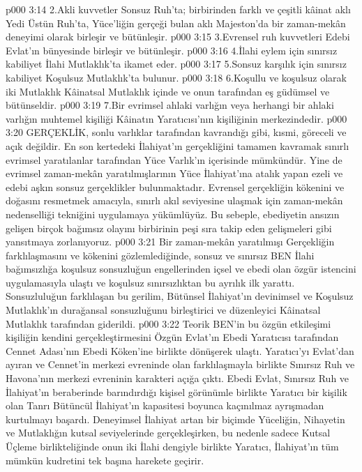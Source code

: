 \vs p000 3:14 2.\bibnobreakspace Akli kuvvetler Sonsuz Ruh’ta; birbirinden farklı ve çeşitli kâinat aklı Yedi Üstün Ruh’ta, Yüce’liğin gerçeği bulan aklı Majeston’da bir zaman\hyp{}mekân deneyimi olarak birleşir ve bütünleşir.
\vs p000 3:15 3.\bibnobreakspace Evrensel ruh kuvvetleri Edebi Evlat’ın bünyesinde birleşir ve bütünleşir.
\vs p000 3:16 4.\bibnobreakspace İlahi eylem için sınırsız kabiliyet İlahi Mutlaklık’ta ikamet eder.
\vs p000 3:17 5.\bibnobreakspace Sonsuz karşılık için sınırsız kabiliyet Koşulsuz Mutlaklık’ta bulunur.
\vs p000 3:18 6.\bibnobreakspace Koşullu ve koşulsuz olarak iki Mutlaklık Kâinatsal Mutlaklık içinde ve onun tarafından eş güdümsel ve bütünseldir.
\vs p000 3:19 7.\bibnobreakspace Bir evrimsel ahlaki varlığın veya herhangi bir ahlaki varlığın muhtemel kişiliği Kâinatın Yaratıcısı’nın kişiliğinin merkezindedir.
\vs p000 3:20 GERÇEKLİK, sonlu varlıklar tarafından kavrandığı gibi, kısmi, göreceli ve açık değildir. En son kertedeki İlahiyat’ın gerçekliğini tamamen kavramak sınırlı evrimsel yaratılanlar tarafından Yüce Varlık’ın içerisinde mümkündür. Yine de evrimsel zaman\hyp{}mekân yaratılmışlarının Yüce İlahiyat’ına atalık yapan ezeli ve edebi aşkın sonsuz gerçeklikler bulunmaktadır. Evrensel gerçekliğin kökenini ve doğasını resmetmek amacıyla, sınırlı akıl seviyesine ulaşmak için zaman\hyp{}mekân nedenselliği tekniğini uygulamaya yükümlüyüz. Bu sebeple, ebediyetin ansızın gelişen birçok bağımsız olayını birbirinin peşi sıra takip eden gelişmeleri gibi yansıtmaya zorlanıyoruz.
\vs p000 3:21 Bir zaman\hyp{}mekân yaratılmışı Gerçekliğin farklılaşmasını ve kökenini gözlemlediğinde, sonsuz ve sınırsız BEN İlahi bağımsızlığa koşulsuz sonsuzluğun engellerinden içsel ve ebedi olan özgür istencini uygulamasıyla ulaştı ve koşulsuz sınırsızlıktan bu ayrılık ilk yarattı. Sonsuzluluğun farklılaşan bu gerilim, Bütünsel İlahiyat’ın devinimsel ve Koşulsuz Mutlaklık’ın durağansal sonsuzluğunu birleştirici ve düzenleyici Kâinatsal Mutlaklık tarafından giderildi.
\vs p000 3:22 Teorik BEN’in bu özgün etkileşimi kişiliğin kendini gerçekleştirmesini Özgün Evlat’ın Ebedi Yaratıcısı tarafından Cennet Adası’nın Ebedi Köken’ine birlikte dönüşerek ulaştı. Yaratıcı’yı Evlat’dan ayıran ve Cennet’in merkezi evreninde olan farklılaşmayla birlikte Sınırsız Ruh ve Havona’nın merkezi evreninin karakteri açığa çıktı. Ebedi Evlat, Sınırsız Ruh ve İlahiyat’ın beraberinde barındırdığı kişisel görünümle birlikte Yaratıcı bir kişilik olan Tanrı Bütüncül İlahiyat’ın kapasitesi boyunca kaçınılmaz ayrışmadan kurtulmayı başardı. Deneyimsel İlahiyat artan bir biçimde Yüceliğin, Nihayetin ve Mutlaklığın kutsal seviyelerinde gerçekleşirken, bu nedenle sadece Kutsal Üçleme birlikteliğinde onun iki İlahi dengiyle birlikte Yaratıcı, İlahiyat’ın tüm mümkün kudretini tek başına harekete geçirir.
